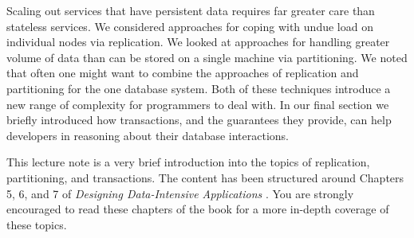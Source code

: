 Scaling out services that have persistent data requires far greater care than stateless services.
We considered approaches for coping with undue load on individual nodes via replication.
We looked at approaches for handling greater volume of data than can be stored on a single machine via partitioning.
We noted that often one might want to combine the approaches of replication and partitioning for the one database system.
Both of these techniques introduce a new range of complexity for programmers to deal with.
In our final section we briefly introduced how transactions, and the guarantees they provide,
can help developers in reasoning about their database interactions.

This lecture note is a very brief introduction into the topics of replication, partitioning, and transactions.
The content has been structured around Chapters 5, 6, and 7 of \textit{Designing Data-Intensive Applications} \cite{data-intensive}.
You are strongly encouraged to read these chapters of the book for a more in-depth coverage of these topics.
